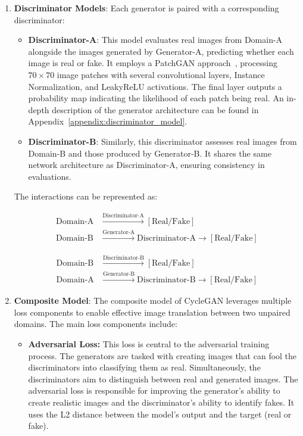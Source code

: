 \documentclass[12pt,DIV14,BCOR12mm,a4paper,footinclude=false,headinclude,parskip=half-,twoside,openright,cleardoublepage=empty,toc=index,bibliography=totoc,listof=totoc]{scrreprt}
\numberwithin{equation}{chapter}
\begin{document}
\begin{enumerate}
    \item \textbf{Discriminator Models}:
    Each generator is paired with a corresponding discriminator:
    \begin{itemize}
        \item \textbf{Discriminator-A}: This model evaluates real images from Domain-A alongside the images generated by Generator-A, predicting whether each image is real or fake. It employs a PatchGAN approach~\cite{isola2017image}, processing $70 \times 70$ image patches with several convolutional layers, Instance Normalization, and LeakyReLU activations. The final layer outputs a probability map indicating the likelihood of each patch being real. An in-depth description of the generator architecture can be found in Appendix~\ref{appendix:discriminator_model}. 
        \item \textbf{Discriminator-B}: Similarly, this discriminator assesses real images from Domain-B and those produced by Generator-B. It shares the same network architecture as Discriminator-A, ensuring consistency in evaluations.
    \end{itemize}

    The interactions can be represented as:

    \begin{align*}
    \text{Domain-A} & \xrightarrow{\text{Discriminator-A}} [\text{Real/Fake}] \\
    \text{Domain-B} & \xrightarrow{\text{Generator-A}} \text{Discriminator-A} \xrightarrow{} [\text{Real/Fake}]
    \end{align*}

    \begin{align*}
    \text{Domain-B} & \xrightarrow{\text{Discriminator-B}} [\text{Real/Fake}] \\
    \text{Domain-A} & \xrightarrow{\text{Generator-B}} \text{Discriminator-B} \xrightarrow{} [\text{Real/Fake}]
    \end{align*}

    \item \textbf{Composite Model}: The composite model of CycleGAN leverages multiple loss components to enable effective image translation between two unpaired domains. The main loss components include:

		\begin{itemize}
				\item \textbf{Adversarial Loss:} This loss is central to the adversarial training process. The generators are tasked with creating images that can fool the discriminators into classifying them as real. Simultaneously, the discriminators aim to distinguish between real and generated images. The adversarial loss is responsible for improving the generator’s ability to create realistic images and the discriminator’s ability to identify fakes. It uses the L2 distance between the model's output and the target (real or fake).


\end{itemize}
\end{enumerate}
\end{document}
